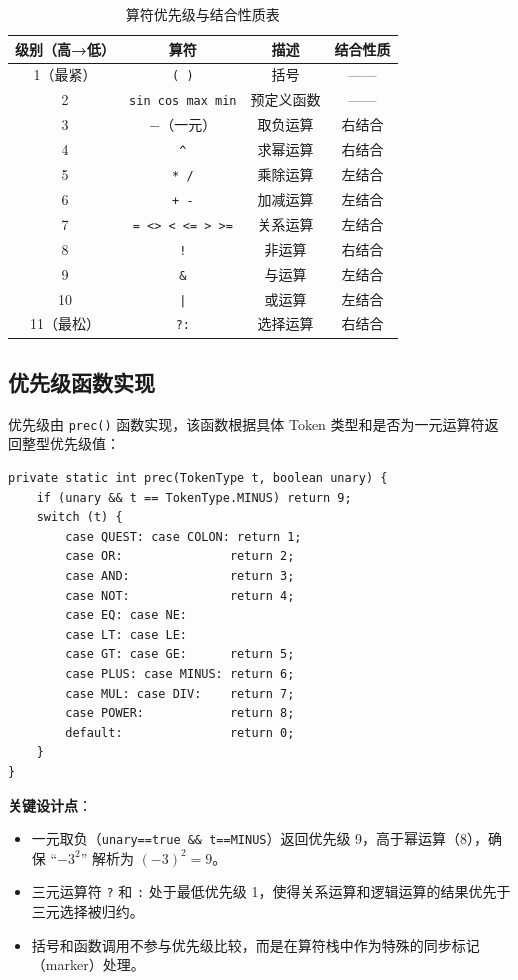 \begin{table}[htbp]
    \centering
    \begin{tabular}{|c|c|c|c|}
    \hline
    \textbf{级别（高→低）} & \textbf{算符} & \textbf{描述} & \textbf{结合性质} \\
    \hline
    1（最紧）& \texttt{( )} & 括号 & —— \\
    2 & \texttt{sin cos max min} & 预定义函数 & —— \\
    3 & $-$（一元）& 取负运算 & 右结合 \\
    4 & \texttt{\^{}} & 求幂运算 & 右结合 \\
    5 & \texttt{* /} & 乘除运算 & 左结合 \\
    6 & \texttt{+ -} & 加减运算 & 左结合 \\
    7 & \texttt{= <> < <= > >=} & 关系运算 & 左结合 \\
    8 & \texttt{!} & 非运算 & 右结合 \\
    9 & \texttt{\&} & 与运算 & 左结合 \\
    10 & \texttt{|} & 或运算 & 左结合 \\
    11（最松）& \texttt{?:} & 选择运算 & 右结合 \\
    \hline
    \end{tabular}
    \caption{算符优先级与结合性质表}
    \label{tab:prec-table}
\end{table}

\subsection{优先级函数实现}

优先级由 \texttt{prec()} 函数实现，该函数根据具体 Token 类型和是否为一元运算符返回整型优先级值：

\begin{lstlisting}[style=cleanjava]
private static int prec(TokenType t, boolean unary) {
    if (unary && t == TokenType.MINUS) return 9;
    switch (t) {
        case QUEST: case COLON: return 1;
        case OR:               return 2;
        case AND:              return 3;
        case NOT:              return 4;
        case EQ: case NE:
        case LT: case LE:
        case GT: case GE:      return 5;
        case PLUS: case MINUS: return 6;
        case MUL: case DIV:    return 7;
        case POWER:            return 8;
        default:               return 0;
    }
}
\end{lstlisting}

\textbf{关键设计点}：
\begin{itemize}
    \item 一元取负（\texttt{unary==true \&\& t==MINUS}）返回优先级 9，高于幂运算（8），确保 ``$-3^2$'' 解析为 $(-3)^2 = 9$。
    \item 三元运算符 \texttt{?} 和 \texttt{:} 处于最低优先级 1，使得关系运算和逻辑运算的结果优先于三元选择被归约。
    \item 括号和函数调用不参与优先级比较，而是在算符栈中作为特殊的同步标记（marker）处理。
\end{itemize}

